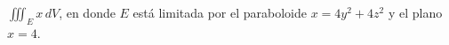 \item $\iiint_E x \, dV$, en donde $E$ está limitada por el paraboloide $x = 4y^2 + 4z^2$ y el plano $x = 4$.

